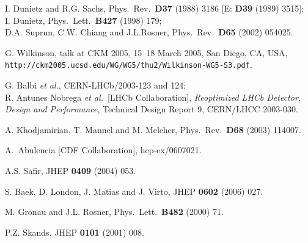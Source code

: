 \documentclass[11pt]{cernrep}
\begin{document}
\begin{thebibliography}{999}
I. Dunietz and R.G. Sachs,
{ Phys.\ Rev.}~{\bf D37} (1988) 3186  [E: {\bf D39} (1989) 3515];\\
I. Dunietz,
{ Phys.\ Lett.}~{\bf B427} (1998) 179;\\
D.A. Suprun, C.W. Chiang and J.L.Rosner,
{ Phys.\ Rev.}~{\bf D65} (2002) 054025.

G. Wilkinson, talk at CKM 2005, 
 15--18 March 2005, San Diego, CA, USA, \\
{\tt http://ckm2005.ucsd.edu/WG/WG5/thu2/Wilkinson-WG5-S3.pdf}.

G. Balbi {\it et al.}, CERN-LHCb/2003-123 and
124;\\
R. Antunes Nobrega {\it et al.}\ [LHCb Collaboration], {\it Reoptimized
LHCb Detector, Design and Performance}, Technical Design Report 9, 
CERN/LHCC 2003-030.

A. Khodjamirian, T. Mannel and M. Melcher,
{ Phys.\ Rev.}~{\bf D68} (2003) 114007.

A.~Abulencia  [CDF Collaboration],
  hep-ex/0607021.
  
 A.S. Safir,
  { JHEP} {\bf 0409} (2004) 053.

S. Baek, D. London, J. Matias and J. Virto,
  JHEP {\bf 0602} (2006) 027.

M. Gronau and J.L. Rosner,
{ Phys.\ Lett.}~{\bf B482} (2000) 71.

P.Z. Skands,
{ JHEP} {\bf 0101} (2001) 008.


\end{thebibliography}
\end{document}
